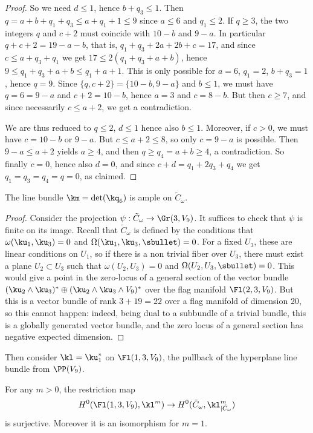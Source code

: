 \begin{proof}
So we need $d\le 1$, hence $b+q_3\le 1$. Then $q=a+b+q_1+q_3\le a+q_1+1\le 9$ since $a\le 6$ and
$q_1\le 2$. If $q\ge 3$, the two integers $q$ and $c+2$ must coincide with $10-b$ and $9-a$.
In particular $q+c+2=19-a-b$, that is, $q_1+q_3+2a+2b+c=17$, and since $c\le a+q_3+q_1$ we get
$17\le 2(q_1+q_3+a+b)$, hence $9\le q_1+q_3+a+b\le q_1+a+1$. This is only possible for $a=6$,
$q_1=2$, $b+q_3=1$, hence $q=9$. Since $\{q,c+2\}=\{10-b,9-a\}$ and $b\le 1$, we must have
$q=6=9-a$ and $c+2=10-b$, hence $a=3$ and $c=8-b$. But then $c\ge 7$, and since necessarily
$c\le a+2$, we get a contradiction.

We are thus reduced to $q\le 2$, $d\le 1$ hence also $b\le 1$. Moreover, if $c>0$, we must have
$c=10-b$ or $9-a$.
But $c\le a+2\le 8$, so only $c=9-a$ is possible. Then $9-a\le a+2$ yields $a\ge 4$,
and then $q\ge q_4=a+b\ge 4$, a contradiction. So finally $c=0$, hence also $d=0$, and since $c+d=q_1+2q_3+q_4$ we get $q_1=q_3=q_4=q=0$, as claimed.
\end{proof}

\begin{lemma}\label{ampleness}
The line bundle $\km=\det(\kq_6)$ is ample on $\tilde C_\omega$.
\end{lemma}

\begin{proof}
Consider the projection $\psi : \tilde C_\omega\to \Gr(3,V_9)$. It suffices to check that $\psi$
is finite on its image. Recall that $\tilde C_\omega$ is defined by the conditions that $\omega(\ku_1,\ku_3)=0$ and
$\Omega(\ku_1,\ku_3,\sbullet)=0$. For a fixed $U_3$, these are linear conditions on $U_1$, so if there is a non
trivial fiber over $U_3$, there must exist a plane $U_2\subset U_3$ such that $\omega(U_2,U_3)=0$ and
$\Omega(U_2,U_3,\sbullet)=0$. This would give a point in the zero-locus of a general section of the vector bundle
$(\ku_2\wedge \ku_3)^*\oplus (\ku_2\wedge \ku_3\wedge V_9)^*$ over the flag manifold $\Fl(2,3,V_9)$. But this is
a vector bundle of rank $3+19=22$ over a flag manifold of dimension $20$, so this cannot happen: indeed,
being dual to a subbundle of a trivial bundle, this is a globally generated vector bundle, and
the zero locus of a general section has negative expected dimension.
\end{proof}

Then consider $\kl = \ku_1^*$ on $\Fl(1,3,V_9)$, the pullback of the hyperplane line bundle from $\PP (V_9)$.

\begin{lemma}\label{projnorm}
For any $m>0$, the restriction map \[
H^0(\Fl(1,3,V_9),\kl^m)\to H^0(\tilde C_\omega,\kl_{|\tilde C_\omega}^m)
\] is surjective.
Moreover it is an isomorphism for $m=1$.
\end{lemma}

